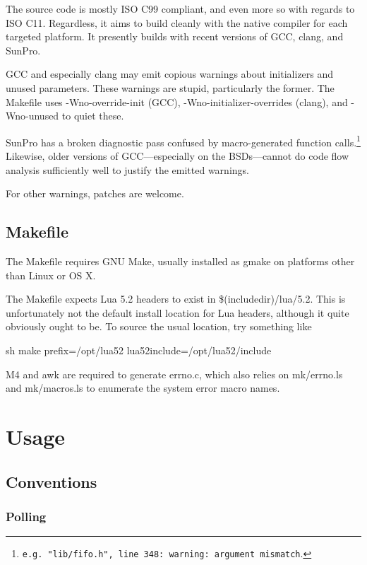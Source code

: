 \documentclass[11pt, oneside]{memoir}
\newcommand*{\key}[1]{#1\index{#1}\xspace}
\begin{document}
The source code is mostly ISO C99 compliant, and even more so with regards to ISO C11. Regardless, it aims to build cleanly with the native compiler for each targeted platform. It presently builds with recent versions of GCC, clang, and SunPro.

GCC and especially clang may emit copious warnings about initializers and unused parameters. These warnings are stupid, particularly the former. The Makefile uses -Wno-override-init (GCC), -Wno-initializer-overrides (clang), and -Wno-unused to quiet these.

SunPro has a broken diagnostic pass confused by macro-generated function calls.\footnote{\texttt{e.g.\ "lib/fifo.h", line 348:\ warning:\ argument mismatch}.} Likewise, older versions of GCC---especially on the BSDs---cannot do code flow analysis sufficiently well to justify the emitted warnings.

For other warnings, patches are welcome.

\section{Makefile}

The Makefile requires GNU Make, usually installed as gmake on platforms other than Linux or OS X.

The Makefile expects Lua 5.2 headers to exist in \$(includedir)/lua/5.2. This is unfortunately not the default install location for Lua headers, although it quite obviously ought to be. To source the usual location, try something like

\begin{code}{sh}
        make prefix=/opt/lua52 lua52include=/opt/lua52/include
\end{code}

\key{M4} and \key{awk} are required to generate errno.c, which also relies on mk/errno.ls and mk/macros.ls to enumerate the system error macro names.

\chapter{Usage}

\section{Conventions}


\subsection{Polling}
\end{document}
